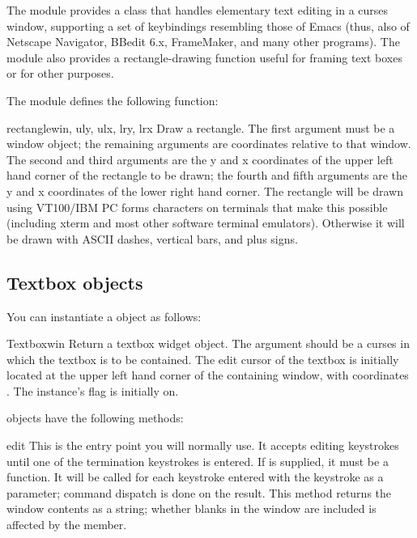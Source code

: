 
The  module provides a  class
that handles elementary text editing in a curses window, supporting a
set of keybindings resembling those of Emacs (thus, also of Netscape
Navigator, BBedit 6.x, FrameMaker, and many other programs).  The
module also provides a rectangle-drawing function useful for framing
text boxes or for other purposes.

The module  defines the following function:

\begin{funcdesc}{rectangle}{win, uly, ulx, lry, lrx}
Draw a rectangle.  The first argument must be a window object; the
remaining arguments are coordinates relative to that window.  The
second and third arguments are the y and x coordinates of the upper
left hand corner of the rectangle to be drawn; the fourth and fifth
arguments are the y and x coordinates of the lower right hand corner.
The rectangle will be drawn using VT100/IBM PC forms characters on
terminals that make this possible (including xterm and most other
software terminal emulators).  Otherwise it will be drawn with ASCII 
dashes, vertical bars, and plus signs.
\end{funcdesc}


\subsection{Textbox objects \label{curses-textpad-objects}}

You can instantiate a  object as follows:

\begin{classdesc}{Textbox}{win}
Return a textbox widget object.  The  argument should be a
curses  in which the textbox is to be contained.
The edit cursor of the textbox is initially located at the upper left
hand corner of the containing window, with coordinates .
The instance's  flag is initially on.
\end{classdesc}

 objects have the following methods:

\begin{methoddesc}{edit}{}
This is the entry point you will normally use.  It accepts editing
keystrokes until one of the termination keystrokes is entered.  If
 is supplied, it must be a function.  It will be called
for each keystroke entered with the keystroke as a parameter; command
dispatch is done on the result. This method returns the window
contents as a string; whether blanks in the window are included is
affected by the  member.
\end{methoddesc}

